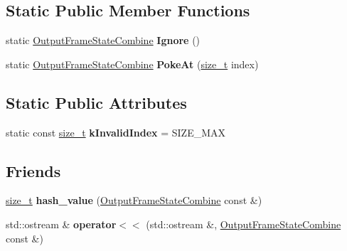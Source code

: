 \subsection*{Static Public Member Functions}
\begin{DoxyCompactItemize}
\item 
\mbox{\label{classv8_1_1internal_1_1compiler_1_1OutputFrameStateCombine_a82c3d7fa1b78d93ef43cfd66db320b71}} 
static \mbox{\hyperlink{classv8_1_1internal_1_1compiler_1_1OutputFrameStateCombine}{Output\+Frame\+State\+Combine}} {\bfseries Ignore} ()
\item 
\mbox{\label{classv8_1_1internal_1_1compiler_1_1OutputFrameStateCombine_a5d1eb7b7ed10db905db627650485f683}} 
static \mbox{\hyperlink{classv8_1_1internal_1_1compiler_1_1OutputFrameStateCombine}{Output\+Frame\+State\+Combine}} {\bfseries Poke\+At} (\mbox{\hyperlink{classsize__t}{size\+\_\+t}} index)
\end{DoxyCompactItemize}
\subsection*{Static Public Attributes}
\begin{DoxyCompactItemize}
\item 
\mbox{\label{classv8_1_1internal_1_1compiler_1_1OutputFrameStateCombine_a0cf0eb628b29f6dd722299fb47b39119}} 
static const \mbox{\hyperlink{classsize__t}{size\+\_\+t}} {\bfseries k\+Invalid\+Index} = S\+I\+Z\+E\+\_\+\+M\+AX
\end{DoxyCompactItemize}
\subsection*{Friends}
\begin{DoxyCompactItemize}
\item 
\mbox{\label{classv8_1_1internal_1_1compiler_1_1OutputFrameStateCombine_a8e824751974d5c56479b21a7aefeceba}} 
\mbox{\hyperlink{classsize__t}{size\+\_\+t}} {\bfseries hash\+\_\+value} (\mbox{\hyperlink{classv8_1_1internal_1_1compiler_1_1OutputFrameStateCombine}{Output\+Frame\+State\+Combine}} const \&)
\item 
\mbox{\label{classv8_1_1internal_1_1compiler_1_1OutputFrameStateCombine_ae57755b6944618f08876a213d0b47c1b}} 
std\+::ostream \& {\bfseries operator$<$$<$} (std\+::ostream \&, \mbox{\hyperlink{classv8_1_1internal_1_1compiler_1_1OutputFrameStateCombine}{Output\+Frame\+State\+Combine}} const \&)
\end{DoxyCompactItemize}


